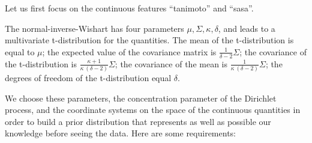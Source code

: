 \documentclass[\ifafour a4paper,12pt,\else a5paper,10pt,\fi%
onecolumn,oneside,article,%
british%
]{memoir}
\theoremstyle{remark}
\theoremstyle{innote}
\renewcommand*{\|}[1][]{\nonscript\:#1\vert\nonscript\:\mathopen{}}
\renewcommand*{\=}{\TextOrMath\texteq\eq}
\begin{document}
Let us first focus on the continuous features \enquote{tanimoto} and
\enquote{sasa}.

The normal-inverse-Wishart has four parameters
$\mu, \varSigma, \kappa, \delta$, and leads to a multivariate
t-distribution for the quantities. The mean of the t-distribution is equal
to $\mu$; the expected value of the covariance matrix is
$\frac{1}{\delta-2}\varSigma$; the covariance of the t-distribution is
$\frac{\kappa+1}{\kappa\ (\delta-2)}\varSigma$; the covariance of the mean
is $\frac{1}{\kappa\ (\delta-2)}\varSigma$; the degrees of freedom of the
t-distribution equal $\delta$.

We choose these parameters, the concentration parameter of the Dirichlet
process, and the coordinate systems on the space of the continuous
quantities in order to build a prior distribution that represents as well
as possible our knowledge before seeing the data. Here are some
requirements:
\end{document}
